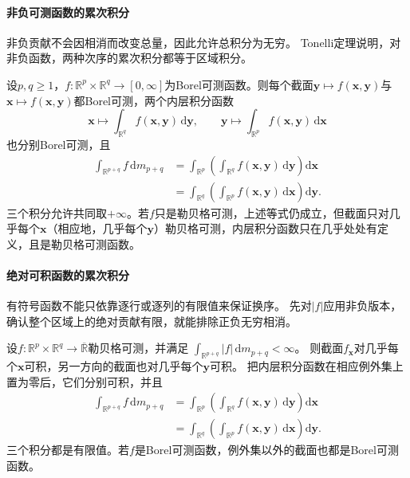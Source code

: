 \paragraph{非负可测函数的累次积分}

非负贡献不会因相消而改变总量，因此允许总积分为无穷。
Tonelli定理说明，对非负函数，两种次序的累次积分都等于区域积分。
\begin{theorem}[Tonelli定理]
\label{thm:analysis-tonelli-fubini}
设$p,q\geq1$，$f:\mathbb R^p\times\mathbb R^q\to[0,\infty]$为Borel可测函数。则每个截面$\bm y\mapsto f(\bm x,\bm y)$与$\bm x\mapsto f(\bm x,\bm y)$都Borel可测，两个内层积分函数
\[
 \bm x\longmapsto\int_{\mathbb R^q}f(\bm x,\bm y)\,\mathrm d\bm y,\qquad
 \bm y\longmapsto\int_{\mathbb R^p}f(\bm x,\bm y)\,\mathrm d\bm x
\]
也分别Borel可测，且
\[
 \begin{aligned}
 \int_{\mathbb R^{p+q}}f\,\mathrm dm_{p+q}
 &=\int_{\mathbb R^p}\left(\int_{\mathbb R^q}f(\bm x,\bm y)\,\mathrm d\bm y\right)\mathrm d\bm x\\
 &=\int_{\mathbb R^q}\left(\int_{\mathbb R^p}f(\bm x,\bm y)\,\mathrm d\bm x\right)\mathrm d\bm y.
 \end{aligned}
\]
三个积分允许共同取$+\infty$。若$f$只是勒贝格可测，上述等式仍成立，但截面只对几乎每个$\bm x$（相应地，几乎每个$\bm y$）勒贝格可测，内层积分函数只在几乎处处有定义，且是勒贝格可测函数。
\end{theorem}

\paragraph{绝对可积函数的累次积分}

有符号函数不能只依靠逐行或逐列的有限值来保证换序。
先对$|f|$应用非负版本，确认整个区域上的绝对贡献有限，就能排除正负无穷相消。
\begin{theorem}[Fubini定理]
\label{thm:analysis-fubini-integrable}
设$f:\mathbb R^p\times\mathbb R^q\to\overline{\mathbb R}$勒贝格可测，并满足
$\int_{\mathbb R^{p+q}}|f|\,\mathrm dm_{p+q}<\infty$。
则截面$f_{\bm x}$对几乎每个$\bm x$可积，另一方向的截面也对几乎每个$\bm y$可积。
把内层积分函数在相应例外集上置为零后，它们分别可积，并且
\[
 \begin{aligned}
 \int_{\mathbb R^{p+q}}f\,\mathrm dm_{p+q}
 &=\int_{\mathbb R^p}\left(\int_{\mathbb R^q}f(\bm x,\bm y)\,\mathrm d\bm y\right)\mathrm d\bm x\\
 &=\int_{\mathbb R^q}\left(\int_{\mathbb R^p}f(\bm x,\bm y)\,\mathrm d\bm x\right)\mathrm d\bm y.
 \end{aligned}
\]
三个积分都是有限值。若$f$是Borel可测函数，例外集以外的截面也都是Borel可测函数。
\end{theorem}

